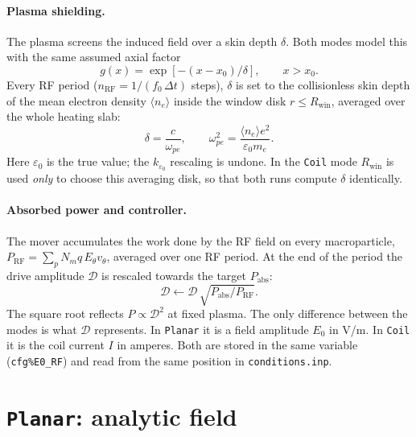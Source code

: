 \documentclass[11pt,a4paper]{article}
\newcommand{\rwin}{R_{\mathrm{win}}}
\newcommand{\code}[1]{\texttt{#1}}
\begin{document}
\paragraph{Plasma shielding.} The plasma screens the induced field over a
skin depth $\delta$. Both modes model this with the same assumed axial factor
\begin{equation}
  g(x) = \exp\!\left[-(x-x_0)/\delta\right], \qquad x > x_0 .
  \label{eq:g}
\end{equation}
Every RF period ($n_{\mathrm{RF}} = 1/(f_0\,\Delta t)$ steps), $\delta$ is
set to the collisionless skin depth of the mean electron density
$\langle n_e\rangle$ inside the window disk $r \le \rwin$, averaged over the
whole heating slab:
\begin{equation}
  \delta = \frac{c}{\omega_{pe}}, \qquad
  \omega_{pe}^2 = \frac{\langle n_e\rangle e^2}{\varepsilon_0 m_e} .
\end{equation}
Here $\varepsilon_0$ is the true value; the $k_{\varepsilon_0}$ rescaling is
undone. In the \code{Coil} mode $\rwin$ is used \emph{only} to choose this
averaging disk, so that both runs compute $\delta$ identically.

\paragraph{Absorbed power and controller.} The mover accumulates the work done
by the RF field on every macroparticle, $P_{\mathrm{RF}} = \sum_p N_m q\,
E_\theta v_\theta$, averaged over one RF period. At the end of the period the
drive amplitude $\mathcal{D}$ is rescaled towards the target $P_{\mathrm{abs}}$:
\begin{equation}
  \mathcal{D} \leftarrow \mathcal{D}\,\sqrt{P_{\mathrm{abs}}/P_{\mathrm{RF}}} .
  \label{eq:ctrl}
\end{equation}
The square root reflects $P \propto \mathcal{D}^2$ at fixed plasma. The only
difference between the modes is what $\mathcal{D}$ represents. In
\code{Planar} it is a field amplitude $E_0$ in \si{V/m}. In \code{Coil} it is
the coil current $I$ in amperes. Both are stored in the same variable
(\code{cfg\%E0\_RF}) and read from the same position in
\code{conditions.inp}.

\section{\texttt{Planar}: analytic field}
\end{document}
